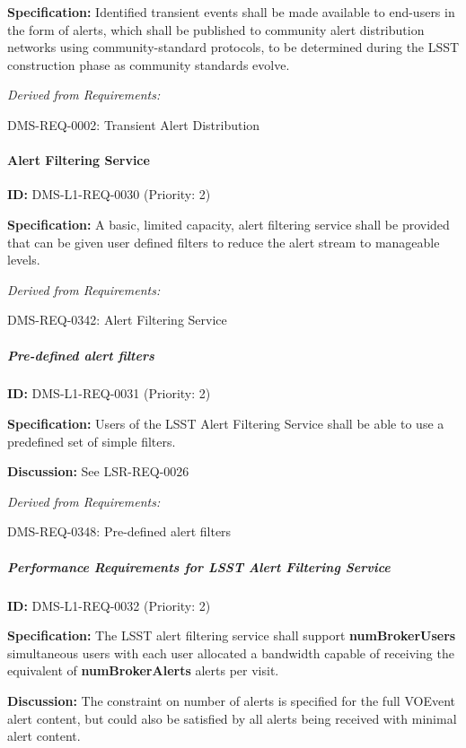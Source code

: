 \documentclass[SE,toc,lsstdraft]{lsstdoc}
\begin{document}
\textbf{Specification:} Identified transient events shall be made available to end-users in the form of alerts, which shall be published to community alert distribution networks using community-standard protocols, to be determined during the LSST construction phase as community standards evolve.

\emph{Derived from Requirements:}

DMS-REQ-0002:
Transient Alert Distribution \newline

\paragraph{Alert Filtering Service}\hfill  %

\label{DMS-L1-REQ-0030}
\textbf{ID:} DMS-L1-REQ-0030 (Priority: 2)

\textbf{Specification:} A basic, limited capacity, alert filtering service shall be provided that can be given user defined filters to reduce the alert stream to manageable levels.

\emph{Derived from Requirements:}

DMS-REQ-0342:
Alert Filtering Service \newline

\subparagraph{Pre-defined alert filters}\hfill  %

\label{DMS-L1-REQ-0031}
\textbf{ID:} DMS-L1-REQ-0031 (Priority: 2)

\textbf{Specification: }Users of the LSST Alert Filtering Service shall be able to use a predefined set of simple filters.

\textbf{Discussion:} See LSR-REQ-0026

\emph{Derived from Requirements:}

DMS-REQ-0348:
Pre-defined alert filters \newline

\subparagraph{Performance Requirements for LSST Alert Filtering Service}\hfill  %

\label{DMS-L1-REQ-0032}
\textbf{ID:} DMS-L1-REQ-0032 (Priority: 2)

\textbf{Specification:} The LSST alert filtering service shall support \textbf{numBrokerUsers} simultaneous users with each user allocated a bandwidth capable of receiving the equivalent of \textbf{numBrokerAlerts} alerts per visit.

\textbf{Discussion:} The constraint on number of alerts is specified for the full VOEvent alert content, but could also be satisfied by all alerts being received with minimal alert content.
\end{document}
